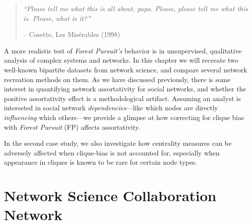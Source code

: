 \documentclass[%
	12pt,
		oneside,
		letterpaper
]{book}
\begin{document}
\begin{flushright}

\begin{minipage}{.7\linewidth}

\singlespacing

\begin{quote}
\emph{``Please tell me what this is all about, papa. Please, please tell me what this is. Please, what is it?''}

\hfill -- Cosette, Les Misérables (1998)\\
\doublespacing
\end{quote}

\end{minipage}

\end{flushright}

A more realistic test of \emph{Forest Pursuit's} behavior is in unsupervised, qualitative analysis of complex systems and networks.
In this chapter we will recreate two well-known bipartite datasets from network science, and compare several network recreation methods on them.
As we have discussed previously\autocite{PerceivedAssortativitySocial_Fisher2017}, there is some interest in quantifying network assortativity for social networks, and whether the positive assortativity effect is a methodological artifact.
Assuming an analyst is interested in social network \emph{dependencies}---like which nodes are directly \emph{influencing} which others---we provide a glimpse at how correcting for clique bias with \emph{Forest Pursuit} (FP) affects assortativity.

In the second case study, we also investigate how centrality measures can be adversely affected when clique-bias is not accounted for, especially when appearance in cliques is known to be rare for certain node types.

\section{Network Science Collaboration Network}\label{network-science-collaboration-network}
\end{document}
